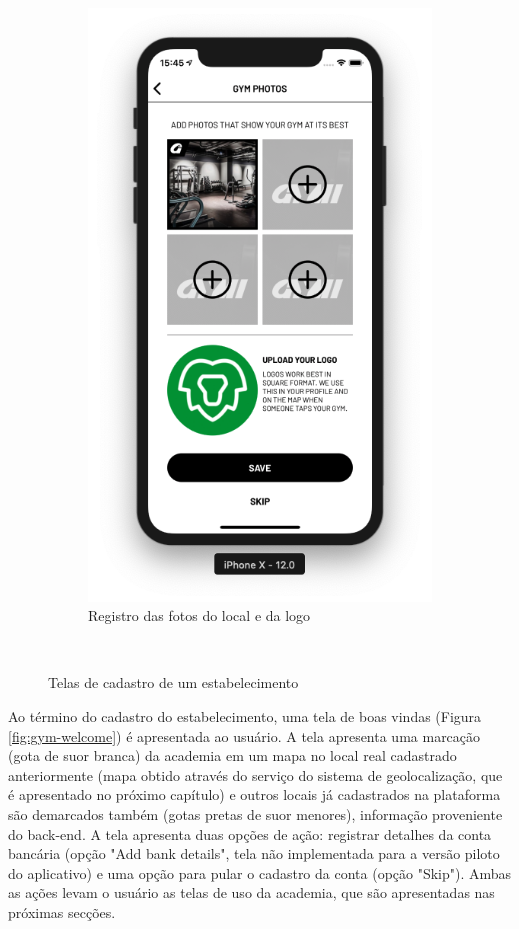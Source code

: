 \begin{figure}[H]
\begin{subfigure}[b]{0.3\textwidth}
        \includegraphics[width=\textwidth]{pfc/figuras/register-gym-photos.png}
        \caption{Registro das fotos do local e da logo}
        \label{fig:register-gym-photos}
    \end{subfigure}
    ~
    \caption{Telas de cadastro de um estabelecimento}
    \label{fig:register-gym}
\end{figure}

Ao término do cadastro do estabelecimento, uma tela de boas vindas (Figura \ref{fig:gym-welcome}) é apresentada ao usuário. A tela apresenta uma marcação (gota de suor branca) da academia em um mapa no local real cadastrado anteriormente (mapa obtido através do serviço do sistema de geolocalização, que é apresentado no próximo capítulo) e outros locais já cadastrados na plataforma são demarcados também (gotas pretas de suor menores), informação proveniente do back-end. A tela apresenta duas opções de ação: registrar detalhes da conta bancária (opção "Add bank details", tela não implementada para a versão piloto do aplicativo) e uma opção para pular o cadastro da conta (opção "Skip"). Ambas as ações levam o usuário as telas de uso da academia, que são apresentadas nas próximas secções.

